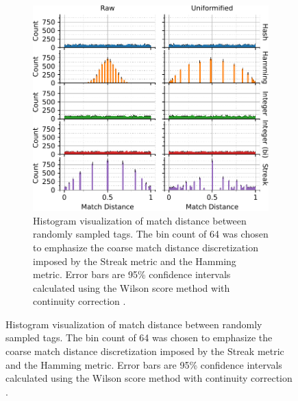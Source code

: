 \begin{figure}
\begin{center}

\begin{minipage}{\linewidth}
\begin{subfigure}[b]{\linewidth}
\begin{minipage}{0.75\textwidth}
\begin{center}
\includegraphics[width=\columnwidth]{img/uniformification/bitweight=0dot5+seed=1+title=low-score-distribution+viz=hist+_data_hathash_hash=75684cf1e73fb7f1+_script_fullcat_hash=2f100d81b8ad6826+ext=}
\end{center}
\end{minipage}
\begin{minipage}{0.23\textwidth}
\caption{
Histogram visualization of match distance between randomly sampled tags.
The bin count of 64 was chosen to emphasize the coarse match distance discretization imposed by the Streak metric and the Hamming metric.
Error bars are 95\% confidence intervals calculated using the Wilson score method with continuity correction \citep{newcombe1998two}.
}
\label{fig:uniformification_hist}
\end{minipage}
\end{subfigure}
\end{minipage}


\end{center}
\end{figure}
